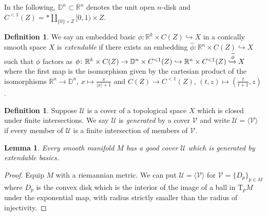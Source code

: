 \documentclass[]{amsart}
\newcommand{\mcal}[1]{\mathcal{#1}}
\newcommand{\mbb}[1]{\mathbb{#1}}
\newcommand{\R}{\mbb{R}}
\newcommand{\Tangent}{\mathrm{T}}
\numberwithin{equation}{section}
\theoremstyle{definition}
\newtheorem{definition}[equation]{Definition}%
\theoremstyle{remark}
\theoremstyle{plain}
\newtheorem{lemma}[equation]{Lemma}
\begin{document}
In the following, $\mbb{D}^n\subset\R^n$ denotes the unit open $n$-disk and $C^{<1}(Z)=\ast\amalg_{\{0\}\times Z}[0,1)\times Z$.

\begin{definition}
    We say an embedded basic $\phi\colon \R^k\times C(Z)\hookrightarrow X$ in a conically smooth space $X$ is \emph{extendable} if there exists an embedding $\widehat{\phi}\colon\R^n\times C(Z)\hookrightarrow X$ such that $\phi$ factors as $\phi\colon\R^{k}\times C(Z)\to \mbb{D}^n\times C^{<1}(Z)\hookrightarrow \R^n\times C^{<1}(Z)\xhookrightarrow{\widehat{\phi}}X$ where the first map is the isomorphism given by the cartesian product of the isomorphisms $\R^n\to\mbb{D}^n$, $x\mapsto \frac{x}{|x|+1}$ and $C(Z)\to C^{<1}(Z)$, $(t,z)\mapsto (\frac{t}{t+1},z)$. 
\end{definition}

\begin{definition}
    Suppose $\mcal{U}$ is a cover of a topological space $X$ which is closed under finite intersections. We say $\mcal{U}$ is \emph{generated} by a cover $\mcal{V}$ and write $\mcal{U}=\langle\mcal{V}\rangle$ if every member of $\mcal{U}$ is a finite intersection of members of $\mcal{V}$.
\end{definition}

\begin{lemma}\label{2978BNV}
    Every smooth manifold $M$ has a good cover $\mcal{U}$ which is generated by extendable basics.
\end{lemma}
\begin{proof}
    Equip $M$ with a riemannian metric. We can put $\mcal{U}=\langle\mcal{V}\rangle$ for $\mcal{V}=\{D_p\}_{p\in M}$ where $D_p$ is the convex disk which is the interior of the image of a ball in $\Tangent_p M$ under the exponential map, with radius strictly smaller than the radius of injectivity.
\end{proof}
\end{document}
